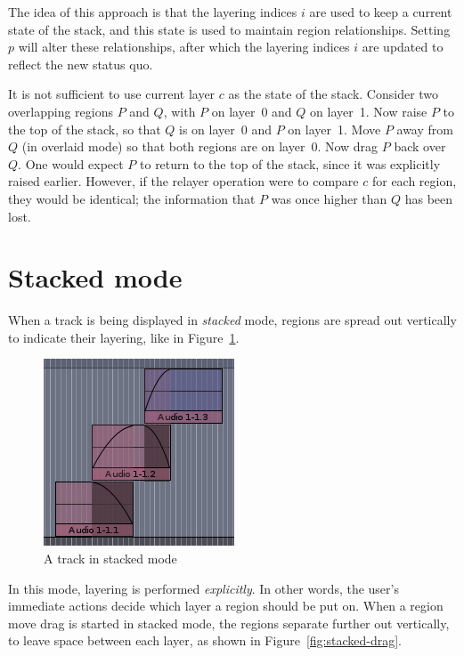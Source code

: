 \documentclass{article}
\begin{document}
The idea of this approach is that the layering indices $i$ are used to keep a
current state of the stack, and this state is used to maintain region
relationships.  Setting $p$ will alter these relationships, after which the
layering indices $i$ are updated to reflect the new status quo.

It is not sufficient to use current layer $c$ as the state of the stack.
Consider two overlapping regions $P$ and $Q$, with $P$ on layer~0 and $Q$ on
layer~1.  Now raise $P$ to the top of the stack, so that $Q$ is on layer~0 and
$P$ on layer~1.  Move $P$ away from $Q$ (in overlaid mode) so that both regions
are on layer~0.  Now drag $P$ back over $Q$.  One would expect $P$ to return to
the top of the stack, since it was explicitly raised earlier.  However, if the
relayer operation were to compare $c$ for each region, they would be identical;
the information that $P$ was once higher than $Q$ has been lost.


\section{Stacked mode}

When a track is being displayed in \emph{stacked} mode, regions are spread out
vertically to indicate their layering, like in Figure~\ref{fig:stacked}.

\begin{figure}[ht]
\begin{center}
\includegraphics[scale=0.5]{stacked.png}
\end{center}
\caption{A track in stacked mode}
\label{fig:stacked}
\end{figure}

In this mode, layering is performed \emph{explicitly}.  In other words, the
user's immediate actions decide which layer a region should be put on.  When a
region move drag is started in stacked mode, the regions separate further out
vertically, to leave space between each layer, as shown in
Figure~\ref{fig:stacked-drag}.
\end{document}

